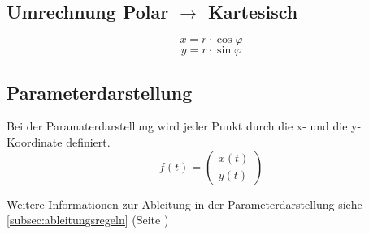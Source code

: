 \subsection{Umrechnung Polar $\rightarrow$ Kartesisch}
\[ \boxed{x = r \cdot \cos{\varphi}} \]
\[ \boxed{y = r \cdot \sin{\varphi}} \]

\subsection{Parameterdarstellung}
Bei der Paramaterdarstellung wird jeder Punkt durch die x- und die y-Koordinate 
definiert. 
\[ \boxed{f(t) = \left(\begin{matrix} x(t)\\ y(t) \end{matrix}\right)} \] 

\noindent 
Weitere Informationen zur Ableitung in der Parameterdarstellung siehe~
\ref{subsec:ableitungsregeln} (Seite \pageref{subsec:ableitungsregeln})
